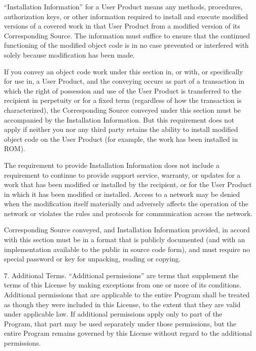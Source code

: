 “Installation Information” for a User Product means any methods, procedures, authorization keys, or other information required to install and execute modified versions of a covered work in that User Product from a modified version of its Corresponding Source. The information must suffice to ensure that the continued functioning of the modified object code is in no case prevented or interfered with solely because modification has been made.

If you convey an object code work under this section in, or with, or specifically for use in, a User Product, and the conveying occurs as part of a transaction in which the right of possession and use of the User Product is transferred to the recipient in perpetuity or for a fixed term (regardless of how the transaction is characterized), the Corresponding Source conveyed under this section must be accompanied by the Installation Information. But this requirement does not apply if neither you nor any third party retains the ability to install modified object code on the User Product (for example, the work has been installed in ROM).

The requirement to provide Installation Information does not include a requirement to continue to provide support service, warranty, or updates for a work that has been modified or installed by the recipient, or for the User Product in which it has been modified or installed. Access to a network may be denied when the modification itself materially and adversely affects the operation of the network or violates the rules and protocols for communication across the network.

Corresponding Source conveyed, and Installation Information provided, in accord with this section must be in a format that is publicly documented (and with an implementation available to the public in source code form), and must require no special password or key for unpacking, reading or copying.

7. Additional Terms.
“Additional permissions” are terms that supplement the terms of this License by making exceptions from one or more of its conditions. Additional permissions that are applicable to the entire Program shall be treated as though they were included in this License, to the extent that they are valid under applicable law. If additional permissions apply only to part of the Program, that part may be used separately under those permissions, but the entire Program remains governed by this License without regard to the additional permissions.

